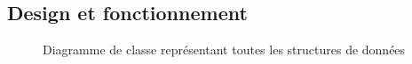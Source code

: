 \documentclass[a4paper]{article}
\begin{document}
\subsection{Design et fonctionnement}
\newpage
\begin{figure}[H]
    \vspace*{-3cm}
   \caption{\label{3} Diagramme de classe représentant toutes les structures de données}
\end{figure}
\end{document}
